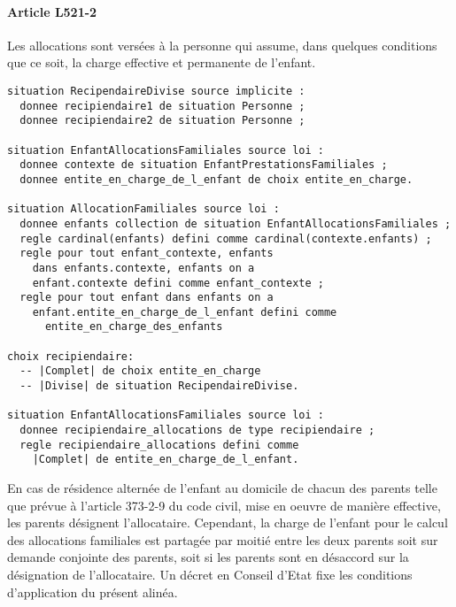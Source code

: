 \documentclass[11pt, french]{article}
\begin{document}
\paragraph{Article L521-2} Les allocations sont versées à la personne qui assume, dans quelques conditions que ce soit, la charge effective et permanente de l'enfant.
\begin{lstlisting}
situation RecipendaireDivise source implicite :
  donnee recipiendaire1 de situation Personne ;
  donnee recipiendaire2 de situation Personne ;

situation EnfantAllocationsFamiliales source loi :
  donnee contexte de situation EnfantPrestationsFamiliales ;
  donnee entite_en_charge_de_l_enfant de choix entite_en_charge.

situation AllocationFamiliales source loi :
  donnee enfants collection de situation EnfantAllocationsFamiliales ;
  regle cardinal(enfants) defini comme cardinal(contexte.enfants) ;
  regle pour tout enfant_contexte, enfants
    dans enfants.contexte, enfants on a
    enfant.contexte defini comme enfant_contexte ;
  regle pour tout enfant dans enfants on a
    enfant.entite_en_charge_de_l_enfant defini comme
      entite_en_charge_des_enfants

choix recipiendaire:
  -- |Complet| de choix entite_en_charge
  -- |Divise| de situation RecipendaireDivise.

situation EnfantAllocationsFamiliales source loi :
  donnee recipiendaire_allocations de type recipiendaire ;
  regle recipiendaire_allocations defini comme
    |Complet| de entite_en_charge_de_l_enfant.
\end{lstlisting}
En cas de résidence alternée de l'enfant au domicile de chacun des parents telle que prévue à l'article 373-2-9 du code civil, mise en oeuvre de manière effective, les parents désignent l'allocataire. Cependant, la charge de l'enfant pour le calcul des allocations familiales est partagée par moitié entre les deux parents soit sur demande conjointe des parents, soit si les parents sont en désaccord sur la désignation de l'allocataire. Un décret en Conseil d'Etat fixe les conditions d'application du présent alinéa.
\end{document}
